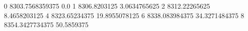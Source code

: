 0 8303.7568359375 0.0
1 8306.8203125 3.0634765625
2 8312.22265625 8.4658203125
4 8323.65234375 19.8955078125
6 8338.083984375 34.3271484375
8 8354.3427734375 50.5859375

